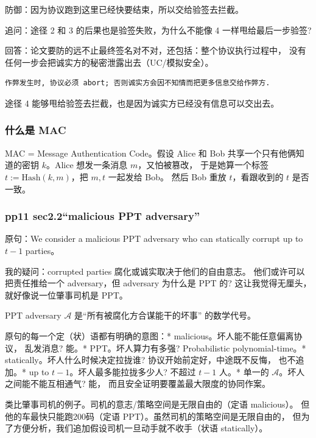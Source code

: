 防御：因为协议跑到这里已经快要结束，所以交给验签去拦截。

追问：途径 2 和 3 的后果也是验签失败，为什么不能像 4
一样甩给最后一步验签?

回答：论文要防的远不止最终签名对不对，还包括：整个协议执行过程中，
没有任何一步会把诚实方的秘密泄露出去（UC/模拟安全）。

\begin{verbatim}
作弊发生时, 协议必须 abort; 否则诚实方会因不知情而把更多信息交给作弊方.
\end{verbatim}

途径 4 能够甩给验签去拦截，也是因为诚实方已经没有信息可以交出去。

\subsubsection{什么是 MAC}

MAC = Message Authentication Code。假设 Alice 和 Bob
共享一个只有他俩知道的密钥 $k$。Alice 想发一条消息 $m$，又怕被篡改，
于是她算一个标签 $t := \mathrm{Hash}(k, m)$，把 $m, t$ 一起发给 Bob。
然后 Bob 重放 $t$，看跟收到的 $t$ 是否一致。

\subsubsection{pp11 sec2.2“malicious PPT adversary”}\label{pp11-sec2.2-malicious-ppt-adversary}

原句：We consider a malicious PPT adversary who can statically corrupt
up to $t - 1$ parties。

我的疑问：corrupted parties 腐化或诚实取决于他们的自由意志。
他们或许可以把责任推给一个 adversary，但 adversary 为什么是 PPT 的?
这让我觉得无厘头，就好像说一位肇事司机是 PPT。

PPT adversary $\mathcal{A}$ 是“所有被腐化方合谋能干的坏事”
的数学代号。

原句的每一个定（状）语都有明确的意图：* malicious。坏人能不能任意偏离协议，
乱发消息? 能。* PPT。坏人算力有多强? Probabilistic polynomial-time。*
statically。坏人什么时候决定拉拢谁? 协议开始前定好，中途既不反悔，
也不追加。* up to $t-1$。坏人最多能拉拢多少人? 不超过 $t-1$ 人。*
单一的 $\mathcal{A}$。坏人之间能不能互相通气? 能，
而且安全证明要覆盖最大限度的协同作案。

类比肇事司机的例子。司机的意志/策略空间是无限自由的（定语 malicious）。
但他的车最快只能跑200码（定语 PPT）。虽然司机的策略空间是无限自由的，
但为了方便分析，我们追加假设司机一旦动手就不收手（状语 statically）。

